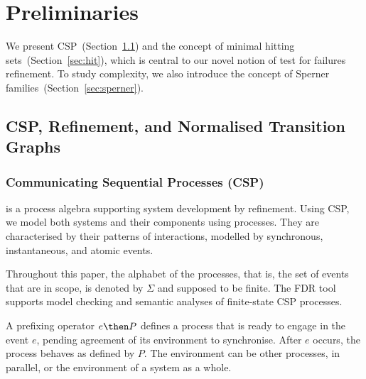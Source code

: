 \section{Preliminaries}
\label{section:preliminaries}

We present CSP~(Section~\ref{section:csp}) and the concept of minimal hitting
sets~(Section~\ref{sec:hit}), which is central to our novel notion of test
for failures refinement. To study complexity, we also introduce the concept
of Sperner families~(Section~\ref{sec:sperner}).

\subsection{CSP, Refinement, and Normalised Transition Graphs}
\label{section:csp}

\subsubsection*{Communicating Sequential Processes (CSP)} is a process algebra
supporting system development by refinement. Using CSP, we model both systems and
their components using processes. They are characterised by their patterns
of interactions, modelled by synchronous, instantaneous, and atomic events.

Throughout this paper, the alphabet of the processes, that is, the set of
events that are in scope, is denoted by $\Sigma$ and supposed to be finite.
The FDR tool~\cite{fdr} supports model checking and semantic analyses of
finite-state CSP processes.


A prefixing operator $e \then P$ defines a process that is ready to engage in
the event $e$, pending agreement of its environment to synchronise. After $e$
occurs, the process behaves as defined by $P$. The environment can be other
processes, in parallel, or the environment of a system as a whole.

